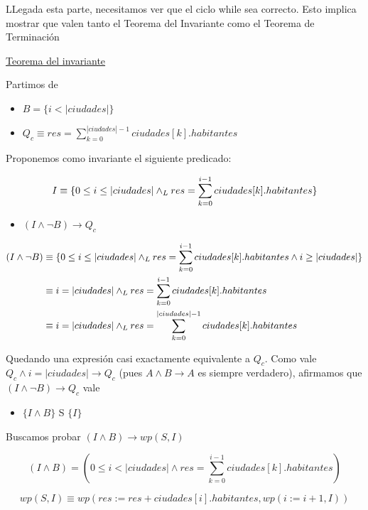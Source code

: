 \documentclass[10pt,a4paper]{article}
\begin{document}
\begin {enumerate}
    LLegada esta parte, necesitamos ver que el ciclo while sea correcto. Esto implica mostrar que valen tanto el Teorema del Invariante como el 
    Teorema de Terminación

    \underline{Teorema del invariante}

    Partimos de 

    \begin{itemize}
        \item $B = \{i < |ciudades| \}$
        \item $Q_{c} \equiv res =  \sum\limits_{k=0}^{|ciudades| - 1}{ciudades[k].habitantes}$
    \end{itemize}

    Proponemos como invariante el siguiente predicado: 

    $$I \equiv \{0 \leq i \leq |ciudades| \land _L res = \sum\limits_{k=0}^{i - 1}{ciudades[k].habitantes}\}$$

    \begin{itemize}
        \item $(I \land \neg B) \to Q_{c}$
    \end{itemize}

    \begin{align*}
        (I \land \neg B) &\equiv \{0 \leq i \leq |ciudades| \land _L res = \sum\limits_{k=0}^{i - 1}{ciudades[k].habitantes} \land i \geq |ciudades|\} \\
        &\equiv i = |ciudades| \land _L res = \sum\limits_{k=0}^{i - 1}{ciudades[k].habitantes} \\
        &\equiv i = |ciudades| \land _L res = \sum\limits_{k=0}^{|ciudades| - 1}{ciudades[k].habitantes}
    \end{align*}

    Quedando una expresión casi exactamente equivalente a $Q_{c}$. Como vale $Q_{c} \land i = |ciudades| \to Q_{c}$ (pues $A \land B \to A$ es siempre verdadero), afirmamos que $(I \land \neg B) \to Q_{c}$ vale 


    \begin{itemize}
    \item $ \{I \land B\}$ S $\{I\}$
    \end{itemize}

    Buscamos probar $(I \land B) \to wp(S, I)$

    $$ (I \land B) = (0 \leq i < |ciudades| \land res = \sum\limits_{k=0}^{i - 1}{ciudades[k].habitantes})$$

    $$wp(S, I) \equiv wp(res := res + ciudades[i].habitantes, wp(i := i + 1, I))$$


\end{enumerate}
\end{document}
